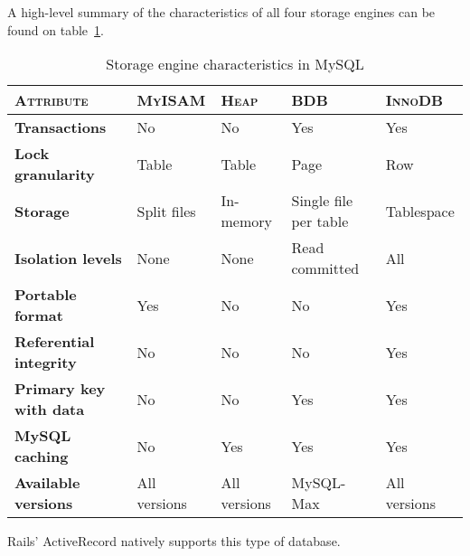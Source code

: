 A high-level summary of the characteristics of all four storage engines can be found on table~\ref{tab:storage_engines_mysql}.
\begin{table}[ht]
  \centering
  
  \begin{tabular}{p{4cm}|p{2cm}|p{2cm}|p{3cm}|p{2cm}}
    \textsc{Attribute}
  & \textsc{MyISAM}
  & \textsc{Heap}
  & \textsc{BDB}
  & \textsc{InnoDB} \\
  \hline

    \textbf{Transactions}
  & No
  & No
  & Yes
  & Yes \\

  \hline
    \textbf{Lock granularity}
  & Table
  & Table
  & Page
  & Row \\

  \hline
    \textbf{Storage}
  & Split files
  & In-memory
  & Single file per table
  & Tablespace \\

  \hline
    \textbf{Isolation levels}
  & None
  & None
  & Read committed
  & All \\

  \hline
    \textbf{Portable format}
  & Yes
  & No
  & No
  & Yes \\

  \hline
    \textbf{Referential integrity}
  & No
  & No
  & No
  & Yes \\

  \hline
    \textbf{Primary key with data}
  & No
  & No
  & Yes
  & Yes \\
    
  \hline
    \textbf{MySQL caching}
  & No
  & Yes
  & Yes
  & Yes \\

  \hline
    \textbf{Available versions}
  & All versions
  & All versions
  & MySQL-Max
  & All versions \\
  \end{tabular}
  \caption{Storage engine characteristics in MySQL}
  \label{tab:storage_engines_mysql}
\end{table}
Rails' ActiveRecord natively supports this type of database.


